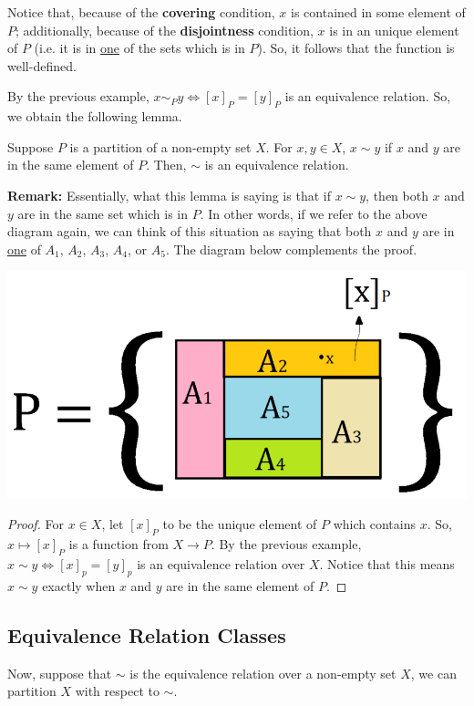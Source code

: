 \documentclass[letterpaper]{article}
\begin{document}
\bigskip 

Notice that, because of the \textbf{covering} condition, $x$ is contained in some element of $P$; additionally, because of the \textbf{disjointness} condition, $x$ is in an unique element of $P$ (i.e. it is in \underline{one} of the sets which is in $P$). So, it follows that the function is well-defined. 

\bigskip 

By the previous example, $x \sim_P y \iff [x]_P = [y]_P$ is an equivalence relation. So, we obtain the following lemma. 
\begin{lemma}{}{}
    Suppose $P$ is a partition of a non-empty set $X$. For $x, y \in X$, $x \sim y$ if $x$ and $y$ are in the same element of $P$. Then, $\sim$ is an equivalence relation.
\end{lemma}
\textbf{Remark:} Essentially, what this lemma is saying is that if $x \sim y$, then both $x$ and $y$ are in the same set which is in $P$. In other words, if we refer to the above diagram again, we can think of this situation as saying that both $x$ and $y$ are in \underline{one} of $A_1$, $A_2$, $A_3$, $A_4$, or $A_5$. The diagram below complements the proof.

\begin{center}
    \includegraphics[scale=0.30]{img/partition_x.PNG}
\end{center}

\begin{proof}
    For $x \in X$, let $[x]_P$ to be the unique element of $P$ which contains $x$. So, $x \mapsto [x]_P$ is a function from $X \to P$. By the previous example, $x \sim y \iff [x]_p = [y]_p$ is an equivalence relation over $X$. Notice that this means $x \sim y$ exactly when $x$ and $y$ are in the same element of $P$. 
\end{proof}

\subsection{Equivalence Relation Classes}
Now, suppose that $\sim$ is the equivalence relation over a non-empty set $X$, we can partition $X$ with respect to $\sim$. 
\end{document}
